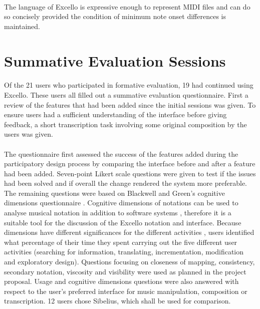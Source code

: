 \paragraph{} The language of Excello is expressive enough to represent MIDI files and can do so concisely provided the condition of minimum note onset differences is maintained.

\section{Summative Evaluation Sessions}

\paragraph{} Of the 21 users who participated in formative evaluation, 19 had continued using Excello. These users all filled out a summative evaluation questionnaire. First a review of the features that had been added since the initial sessions was given. To ensure users had a sufficient understanding of the interface before giving feedback, a short transcription task involving some original composition by the users was given.

\paragraph{} The questionnaire first assessed the success of the features added during the participatory design process by comparing the interface before and after a feature had been added. Seven-point Likert scale questions were given to test if the issues had been solved and if overall the change rendered the system more preferable. The remaining questions were based on Blackwell and Green's cognitive dimensions questionnaire \cite{blackwell:questionnaire}. Cognitive dimensions of notations can be used to analyse musical notation \cite{blackwell:notation} in addition to software systems \cite{green:cdn}, therefore it is a suitable tool for the discussion of the Excello notation and interface. Because dimensions have different significances for the different activities \cite{blackwell:tutorial}, users identified what percentage of their time they spent carrying out the five different user activities (searching for information, translating, incrementation, modification and exploratory design). Questions focusing on closeness of mapping, consistency, secondary notation, viscosity and visibility were used as planned in the project proposal. Usage and cognitive dimensions questions were also answered with respect to the user's preferred interface for music manipulation, composition or transcription. 12 users chose Sibelius, which shall be used for comparison.

